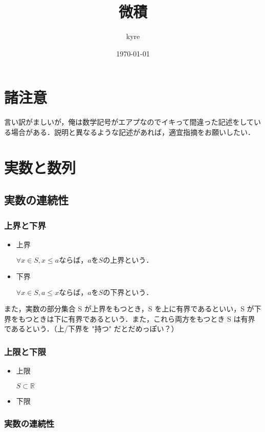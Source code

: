 \documentclass[platex,dvipdfmx]{jlreq}			%
\title{微積}
\author{kyre}
\date{\today}
\begin{document}
\section*{諸注意}
言い訳がましいが，俺は数学記号がエアプなのでイキって間違った記述をしている場合がある．説明と異なるような記述があれば，適宜指摘をお願いしたい．

\section{実数と数列}

\subsection{実数の連続性}

\subsubsection{上界と下界}
\begin{tcolorbox}
\begin{itemize}
\item 上界 

\begin{math}
\forall x \in S, x \leq a ならば， a を S の上界という．
\end{math}

\item 下界 

\begin{math}
\forall x \in S, a \leq x ならば，a を S の下界という．
\end{math}
\end{itemize}
\end{tcolorbox}
また，実数の部分集合 S が上界をもつとき，S を上に有界であるといい，S が下界をもつときは下に有界であるという．また，これら両方をもつとき S は有界であるという．（上/下界を "持つ" だとだめっぽい？）

\subsubsection{上限と下限}
\begin{tcolorbox}
\begin{itemize}
\item 上限 

\begin{math}
S \subset \mathbb{R}
\end{math}
\item 下限
\end{itemize}
\end{tcolorbox}

\subsubsection{実数の連続性}
\end{document}
